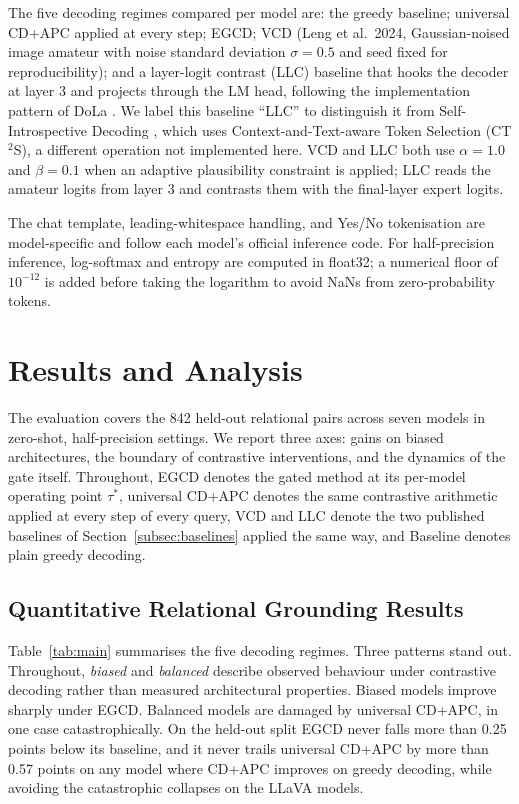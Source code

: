 \documentclass{ieeeaccess}
\begin{document}
The five decoding regimes compared per model are: the greedy baseline; universal CD+APC applied at every step; EGCD; VCD (Leng et al.\ 2024, Gaussian-noised image amateur with noise standard deviation $\sigma = 0.5$ and seed fixed for reproducibility); and a layer-logit contrast (LLC) baseline that hooks the decoder at layer 3 and projects through the LM head, following the implementation pattern of DoLa \cite{chuang2024dola}. We label this baseline ``LLC'' to distinguish it from Self-Introspective Decoding \cite{huo2025self}, which uses Context-and-Text-aware Token Selection (CT$^{2}$S), a different operation not implemented here. VCD and LLC both use $\alpha = 1.0$ and $\beta = 0.1$ when an adaptive plausibility constraint is applied; LLC reads the amateur logits from layer 3 and contrasts them with the final-layer expert logits.

The chat template, leading-whitespace handling, and Yes/No tokenisation are model-specific and follow each model's official inference code. For half-precision inference, log-softmax and entropy are computed in float32; a numerical floor of $10^{-12}$ is added before taking the logarithm to avoid NaNs from zero-probability tokens.

\section{Results and Analysis}\label{sec:results}

The evaluation covers the 842 held-out relational pairs across seven models in zero-shot, half-precision settings. We report three axes: gains on biased architectures, the boundary of contrastive interventions, and the dynamics of the gate itself. Throughout, EGCD denotes the gated method at its per-model operating point $\tau^{*}$, universal CD+APC denotes the same contrastive arithmetic applied at every step of every query, VCD and LLC denote the two published baselines of Section~\ref{subsec:baselines} applied the same way, and Baseline denotes plain greedy decoding.

\subsection{Quantitative Relational Grounding Results}\label{subsec:quant}

Table~\ref{tab:main} summarises the five decoding regimes. Three patterns stand out. Throughout, \emph{biased} and \emph{balanced} describe observed behaviour under contrastive decoding rather than measured architectural properties. Biased models improve sharply under EGCD. Balanced models are damaged by universal CD+APC, in one case catastrophically. On the held-out split EGCD never falls more than 0.25 points below its baseline, and it never trails universal CD+APC by more than 0.57 points on any model where CD+APC improves on greedy decoding, while avoiding the catastrophic collapses on the LLaVA models.
\end{document}
